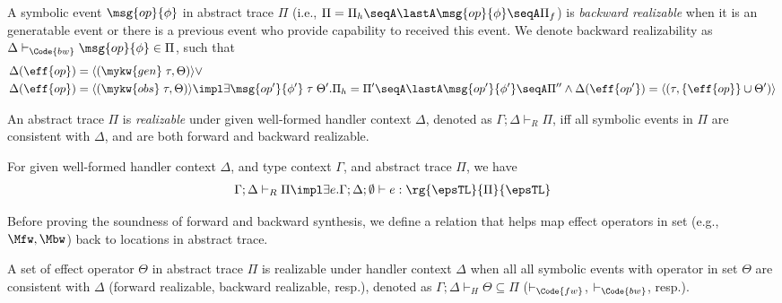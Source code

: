 \begin{definition}
  \label{def:bw-realizable}
  A symbolic event $\msg{op}{\phi}$ in abstract trace $\Pi$ (i.e.,
  $\Pi = \Pi_h \seqA \lastA \msg{op}{\phi} \seqA \Pi_f$) is
  \emph{backward realizable} when it is an generatable event or there
  is a previous event who provide capability to received this event.
  We denote backward realizability as
  $\Delta \vdash_\Code{bw} \msg{op}{\phi} \in \Pi$, such that
  {\small\begin{align*}
    &\Delta(\eff{op}) = \langle (\mykw{gen}\;\tau, \Theta) \rangle \lor
    \\&\Delta(\eff{op}) = \langle (\mykw{obs}\;\tau, \Theta) \rangle \impl  \exists \msg{op'}{\phi'}\;\tau\;\Theta'. \Pi_h = \Pi' \seqA \lastA\msg{op'}{\phi'} \seqA \Pi'' \land \Delta(\eff{op'}) = \langle (\tau, \{\eff{op}\} \cup \Theta') \rangle
\end{align*}}\noindent
\end{definition}


\begin{definition}
  \label{def:realizable-trace}
  An abstract trace $\Pi$ is \emph{realizable} under given well-formed
  handler context $\Delta$, denoted as $\Gamma;\Delta \vdash_{R} \Pi$,
  iff all symbolic events in $\Pi$ are consistent with $\Delta$, and
  are both forward and backward realizable.
\end{definition}

\begin{lemma}%
  \label{lemma:real-term}
  For given well-formed handler context $\Delta$, and type context
  $\Gamma$, and abstract trace $\Pi$, we have
 {\small\begin{align*}
 \Gamma;\Delta \vdash_{R} \Pi \impl \exists e. \Gamma;\Delta;\emptyset \vdash e : \rg{\epsTL}{\Pi}{\epsTL}
\end{align*}}
\end{lemma}

Before proving the soundness of forward and backward synthesis, we
define a relation that helps map effect operators in set (e.g.,
$\Mfw, \Mbw$) back to locations in abstract trace.

\begin{definition}
  \label{def:realizable-set}
  A set of effect operator $\Theta$ in
  abstract trace $\Pi$ is realizable under handler context $\Delta$
  when all all symbolic events with operator in set $\Theta$ are
  consistent with $\Delta$ (forward realizable, backward realizable,
  resp.), denoted as $\Gamma;\Delta \vdash_H \Theta \subseteq \Pi$
  ($\vdash_\Code{fw}$, $\vdash_\Code{bw}$, resp.). %
\end{definition}

